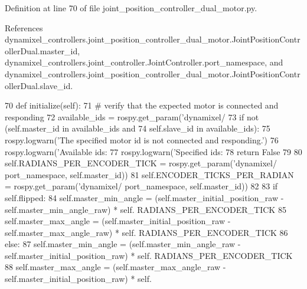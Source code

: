 Definition at line 70 of file joint\+\_\+position\+\_\+controller\+\_\+dual\+\_\+motor.\+py.



References dynamixel\+\_\+controllers.\+joint\+\_\+position\+\_\+controller\+\_\+dual\+\_\+motor.\+Joint\+Position\+Controller\+Dual.\+master\+\_\+id, dynamixel\+\_\+controllers.\+joint\+\_\+controller.\+Joint\+Controller.\+port\+\_\+namespace, and dynamixel\+\_\+controllers.\+joint\+\_\+position\+\_\+controller\+\_\+dual\+\_\+motor.\+Joint\+Position\+Controller\+Dual.\+slave\+\_\+id.


\begin{DoxyCode}
70     \textcolor{keyword}{def }initialize(self):
71         \textcolor{comment}{# verify that the expected motor is connected and responding}
72         available\_ids = rospy.get\_param(\textcolor{stringliteral}{'dynamixel/%
73         \textcolor{keywordflow}{if} \textcolor{keywordflow}{not} (self.master\_id \textcolor{keywordflow}{in} available\_ids \textcolor{keywordflow}{and}
74                 self.slave\_id \textcolor{keywordflow}{in} available\_ids):
75             rospy.logwarn(\textcolor{stringliteral}{'The specified motor id is not connected and responding.'})
76             rospy.logwarn(\textcolor{stringliteral}{'Available ids: %
77             rospy.logwarn(\textcolor{stringliteral}{'Specified ids: %
78             \textcolor{keywordflow}{return} \textcolor{keyword}{False}
79             
80         self.RADIANS\_PER\_ENCODER\_TICK = rospy.get\_param(\textcolor{stringliteral}{'dynamixel/%
      port\_namespace, self.master\_id))
81         self.ENCODER\_TICKS\_PER\_RADIAN = rospy.get\_param(\textcolor{stringliteral}{'dynamixel/%
      port\_namespace, self.master\_id))
82         
83         \textcolor{keywordflow}{if} self.flipped:
84             self.master\_min\_angle = (self.master\_initial\_position\_raw - self.master\_min\_angle\_raw) * self.
      RADIANS\_PER\_ENCODER\_TICK
85             self.master\_max\_angle = (self.master\_initial\_position\_raw - self.master\_max\_angle\_raw) * self.
      RADIANS\_PER\_ENCODER\_TICK
86         \textcolor{keywordflow}{else}:
87             self.master\_min\_angle = (self.master\_min\_angle\_raw - self.master\_initial\_position\_raw) * self.
      RADIANS\_PER\_ENCODER\_TICK
88             self.master\_max\_angle = (self.master\_max\_angle\_raw - self.master\_initial\_position\_raw) * self.
}}}}}
\end{DoxyCode}
